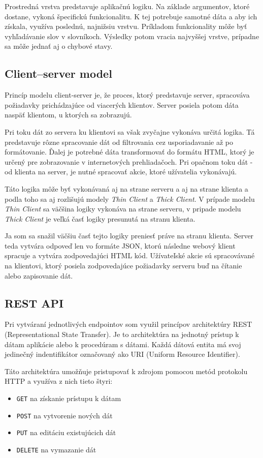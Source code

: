 \documentclass[
  digital, %
  table,   %
  lof,     %
  lot,     %
]{fithesis3}
\begin{document}
Prostredná vrstva predstavuje aplikačnú logiku. Na základe argumentov, ktoré dostane, vykoná špecifickú funkcionalitu. K tej potrebuje samotné dáta a aby ich získala, využíva poslednú, najnižsiu vrstvu. Príkladom funkcionality môže byť vyhľadávanie slov v slovníkoch. Výsledky potom vracia najvyššej vrstve, prípadne sa môže jednať aj o chybové stavy.

\subsection{Client–server model}
Princíp modelu client-server je, že proces, ktorý predstavuje server, spracováva požiadavky prichádzajúce od viacerých klientov. Server posiela potom dáta naspäť klientom, u ktorých sa zobrazujú.

Pri toku dát zo servera ku klientovi sa však zvyčajne vykonáva určitá logika. Tá predstavuje rôzne spracovanie dát od filtrovania cez usporiadavanie až po formátovanie. Ďalej je potrebné dáta transformovať do formátu HTML, ktorý je určený pre zobrazovanie v internetových prehliadačoch. Pri opačnom toku dát - od klienta na server, je nutné spracovať akcie, ktoré užívatelia vykonávajú.

Táto logika môže byť vykonávaná aj na strane serveru a aj na strane klienta a podla toho sa aj rozlišujú modely \textit{Thin Client} a \textit{Thick Client}. V prípade modelu \textit{Thin Client} sa väčšina logiky vykonáva na strane serveru, v pripade modelu \textit{Thick Client} je veľká časť logiky presunutá na stranu klienta.

Ja som sa snažil väčšiu časť tejto logiky preniesť práve na stranu klienta. Server teda vytvára odpoveď len vo formáte JSON, ktorú následne webový klient spracuje a vytvára zodpovedajúci HTML kód. Užívateľské akcie sú spracovávané na klientovi, ktorý posiela zodpovedajúce požiadavky serveru buď na čítanie alebo zapisovanie dát.

\subsection{REST API}
Pri vytváraní jednotlivých endpointov som využil princípov architektúry REST (Representational State Transfer). Je to architektúra na jednotný prístup k dátam aplikácie alebo k procedúram s dátami. Každá dátová entita má svoj jedinečný indentifikátor označovaný ako URI (Uniform Resource Identifier).

Táto architektúra umožňuje pristupovať k zdrojom pomocou metód protokolu HTTP a využíva z nich tieto štyri:
\begin{itemize}
	\item \texttt{GET} na získanie prístupu k dátam
	\item \texttt{POST} na vytvorenie nových dát
	\item \texttt{PUT} na editáciu existujúcich dát
    \item \texttt{DELETE} na vymazanie dát
\end{itemize}
\end{document}
